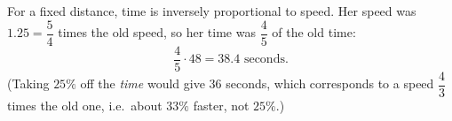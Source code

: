 For a fixed distance, time is inversely proportional to speed. Her speed was $1.25=\dfrac{5}{4}$ times the old speed, so her time was $\dfrac{4}{5}$ of the old time:
\[
\dfrac{4}{5}\cdot48=\boxed{38.4\text{ seconds}}.
\]
(Taking $25\%$ off the \emph{time} would give $36$ seconds, which corresponds to a speed $\dfrac{4}{3}$ times the old one, i.e.\ about $33\%$ faster, not $25\%$.)
